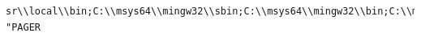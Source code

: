 \documentclass[11pt]{article}
\begin{document}
\begin{verbatim}
sr\\local\\bin;C:\\msys64\\mingw32\\sbin;C:\\msys64\\mingw32\\bin;C:\\msys64\\mingw64\\sbin;C:\\msys64\\mingw64\\bin;C:\\msys64\\usr\\sbin;C:\\msys64\\usr\\bin;C:\\msys64\\usr\\bin;C:\\Windows\\System32;C:\\Windows;C:\\Windows\\System32\\Wbem;C:\\Windows\\System32\\WindowsPowerShell\\v1.0\\" "PAGER
\end{verbatim}
\end{document}
